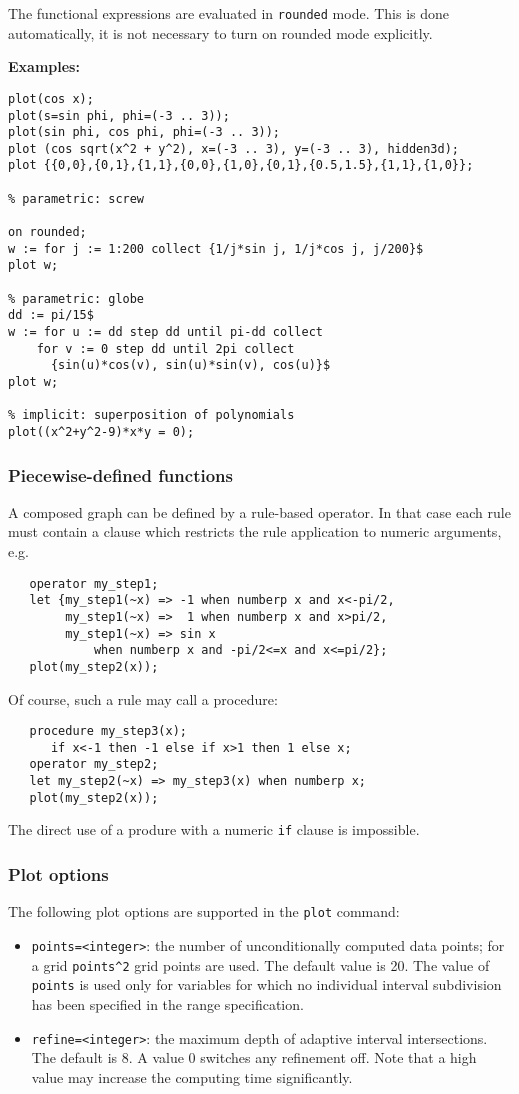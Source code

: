 The functional expressions are evaluated in \texttt{rounded} mode.  This is done
automatically, it is not necessary to turn on rounded mode explicitly.

\textbf{Examples:}
\begin{verbatim}
plot(cos x);
plot(s=sin phi, phi=(-3 .. 3));
plot(sin phi, cos phi, phi=(-3 .. 3));
plot (cos sqrt(x^2 + y^2), x=(-3 .. 3), y=(-3 .. 3), hidden3d);
plot {{0,0},{0,1},{1,1},{0,0},{1,0},{0,1},{0.5,1.5},{1,1},{1,0}};

% parametric: screw

on rounded;
w := for j := 1:200 collect {1/j*sin j, 1/j*cos j, j/200}$
plot w;

% parametric: globe
dd := pi/15$
w := for u := dd step dd until pi-dd collect
    for v := 0 step dd until 2pi collect
      {sin(u)*cos(v), sin(u)*sin(v), cos(u)}$
plot w;

% implicit: superposition of polynomials
plot((x^2+y^2-9)*x*y = 0);
\end{verbatim}


\subsubsection{Piecewise-defined functions}
A composed graph can be defined by a rule-based operator.  In that case each
rule must contain a clause which restricts the rule application to numeric
arguments, e.g.
\begin{verbatim}
   operator my_step1;
   let {my_step1(~x) => -1 when numberp x and x<-pi/2,
        my_step1(~x) =>  1 when numberp x and x>pi/2,
        my_step1(~x) => sin x
            when numberp x and -pi/2<=x and x<=pi/2};
   plot(my_step2(x));
\end{verbatim}
Of course, such a rule may call a procedure:
\begin{verbatim}
   procedure my_step3(x);
      if x<-1 then -1 else if x>1 then 1 else x;
   operator my_step2;
   let my_step2(~x) => my_step3(x) when numberp x;
   plot(my_step2(x));
\end{verbatim}
The direct use of a produre with a numeric \texttt{if} clause is impossible.

\subsubsection{Plot options}
The following plot options are supported in the \texttt{plot} command:
\begin{itemize}
   \item \texttt{points=<integer>}: the number of unconditionally computed data
     points; for a grid \texttt{points\^{}2} grid points are used.  The default
     value is 20. The value of \texttt{points} is used only for variables for
     which no individual interval subdivision has been specified in the range
     specification.
   \item \texttt{refine=<integer>}: the maximum depth of adaptive interval
     intersections. The default is 8. A value 0 switches any refinement
     off. Note that a high value may increase the computing time significantly.
\end{itemize}


